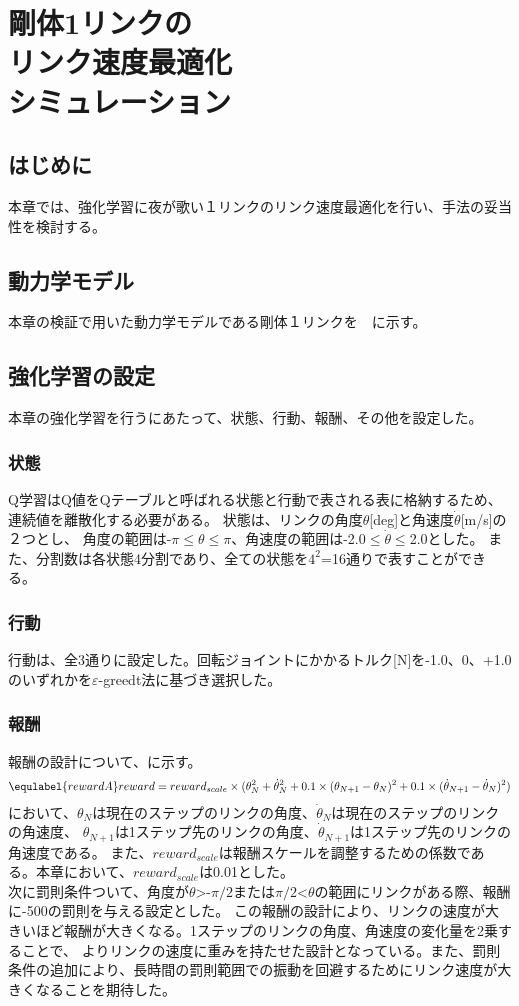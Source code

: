 \chapter[剛体1リンクのリンク速度最適化シミュレーション]{剛体1リンクの\\リンク速度最適化\\シミュレーション}

\section{はじめに}
本章では、強化学習に夜が歌い１リンクのリンク速度最適化を行い、手法の妥当性を検討する。
\section{動力学モデル}
本章の検証で用いた動力学モデルである剛体１リンクを　に示す。
\section{強化学習の設定}
本章の強化学習を行うにあたって、状態、行動、報酬、その他を設定した。
\subsection{状態}
Q学習はQ値をQテーブルと呼ばれる状態と行動で表される表に格納するため、連続値を離散化する必要がある。
状態は、リンクの角度$\theta$[deg]と角速度$\dot{\theta}$[m/s]の２つとし、
角度の範囲は-$\pi$$\leq$$\theta$$\leq$$\pi$、角速度の範囲は-2.0$\leq$$\dot{\theta}$$\leq$2.0とした。
また、分割数は各状態4分割であり、全ての状態を$4^{2}$=16通りで表すことができる。
\subsection{行動}
行動は、全3通りに設定した。回転ジョイントにかかるトルク[N]を-1.0、0、+1.0のいずれかを$\varepsilon$-greedt法に基づき選択した。
\subsection{報酬}
報酬の設計について、に示す。
\begin{eqnarray}
  \equlabel{rewardA}
  reward=reward_{scale}\times(\theta_N^2+\dot{\theta}_N^2
  +0.1\times(\theta_{N+1}-\theta_N)^2
  +0.1\times(\dot{\theta}_{N+1}-\dot{\theta}_N)^2)
\end{eqnarray}
において、$\theta_N$は現在のステップのリンクの角度、$\dot{\theta}_N$は現在のステップのリンクの角速度、
$\theta_{N+1}$は1ステップ先のリンクの角度、$\dot{\theta}_{N+1}$は1ステップ先のリンクの角速度である。
また、$reward_{scale}$は報酬スケールを調整するための係数である。本章において、$reward_{scale}$は0.01とした。\\
次に罰則条件ついて、角度が$\theta$>-$\pi/2$または$\pi/2$<$\theta$の範囲にリンクがある際、報酬に-500の罰則を与える設定とした。
この報酬の設計により、リンクの速度が大きいほど報酬が大きくなる。1ステップのリンクの角度、角速度の変化量を2乗することで、
よりリンクの速度に重みを持たせた設計となっている。また、罰則条件の追加により、長時間の罰則範囲での振動を回避するためにリンク速度が大きくなることを期待した。
